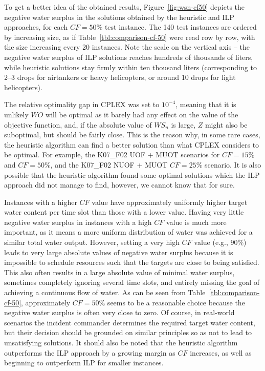 To get a better idea of the obtained results, Figure~\ref{fig:wsn-cf50} depicts the negative water surplus in the solutions obtained by the heuristic and ILP approaches, for each $\mathit{CF} = 50\%$ test instance.
The 140 test instances are ordered by increasing size, as if Table~\ref{tbl:comparison-cf-50} were read row by row, with the size increasing every 20 instances.
Note the scale on the vertical axis -- the negative water surplus of ILP solutions reaches hundreds of thousands of liters, while heuristic solutions stay firmly within ten thousand liters (corresponding to 2--3 drops for airtankers or heavy helicopters, or around 10 drops for light helicopters).

The relative optimality gap in CPLEX was set to $10^{-4}$, meaning that it is unlikely $\mathit{WO}$ will be optimal as it barely had any effect on the value of the objective function, and, if the absolute value of $\mathit{WS_n}$ is large, $\mathit{Z}$ might also be suboptimal, but should be fairly close.
This is the reason why, in some rare cases, the heuristic algorithm can find a better solution than what CPLEX considers to be optimal.
For example, the K07\_F02 UOF + MUOT scenarios for $\mathit{CF} = 15\%$ and $\mathit{CF} = 50\%$, and the K07\_F02 NUOF + MUOT $\mathit{CF} = 25\%$ scenario.
It is also possible that the heuristic algorithm found some optimal solutions which the ILP approach did not manage to find, however, we cannot know that for sure.

Instances with a higher $\mathit{CF}$ value have approximately uniformly higher target water content per time slot than those with a lower value.
Having very little negative water surplus in instances with a high $\mathit{CF}$ value is much more important, as it means a more uniform distribution of water was achieved for a similar total water output.
However, setting a very high $\mathit{CF}$ value (e.g., $90\%$) leads to very large absolute values of negative water surplus because it is impossible to schedule resources such that the targets are close to being satisfied.
This also often results in a large absolute value of minimal water surplus, sometimes completely ignoring several time slots, and entirely missing the goal of achieving a continuous flow of water.
As can be seen from Table~\ref{tbl:comparison-cf-50}, approximately $\mathit{CF} = 50\%$ seems to be a reasonable choice because the negative water surplus is often very close to zero.
Of course, in real-world scenarios the incident commander determines the required target water content, but their decision should be grounded on similar principles so as not to lead to unsatisfying solutions.
It should also be noted that the heuristic algorithm outperforms the ILP approach by a growing margin as $\mathit{CF}$ increases, as well as beginning to outperform ILP for smaller instances.

